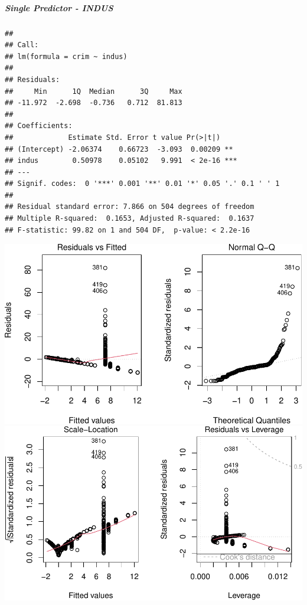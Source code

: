 \documentclass[
]{article}
\begin{document}
\hypertarget{single-predictor---indus}{%
\subparagraph{\texorpdfstring{\textbf{Single Predictor -
INDUS}}{Single Predictor - INDUS}}\label{single-predictor---indus}}

\begin{verbatim}
## 
## Call:
## lm(formula = crim ~ indus)
## 
## Residuals:
##     Min      1Q  Median      3Q     Max 
## -11.972  -2.698  -0.736   0.712  81.813 
## 
## Coefficients:
##             Estimate Std. Error t value Pr(>|t|)    
## (Intercept) -2.06374    0.66723  -3.093  0.00209 ** 
## indus        0.50978    0.05102   9.991  < 2e-16 ***
## ---
## Signif. codes:  0 '***' 0.001 '**' 0.01 '*' 0.05 '.' 0.1 ' ' 1
## 
## Residual standard error: 7.866 on 504 degrees of freedom
## Multiple R-squared:  0.1653, Adjusted R-squared:  0.1637 
## F-statistic: 99.82 on 1 and 504 DF,  p-value: < 2.2e-16
\end{verbatim}

\includegraphics{Disha_Gandhi_Take_Home_Exam_PDF_files/figure-latex/unnamed-chunk-19-1.pdf}
\includegraphics{Disha_Gandhi_Take_Home_Exam_PDF_files/figure-latex/unnamed-chunk-19-2.pdf}
\end{document}
